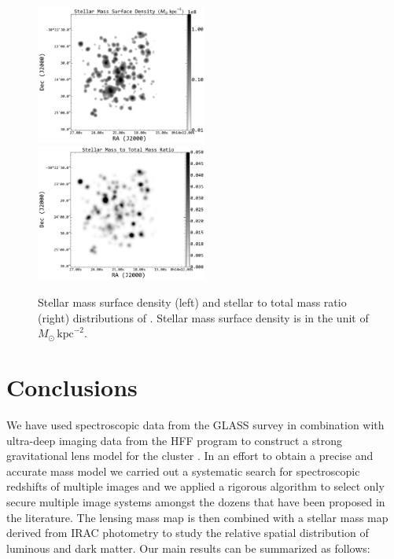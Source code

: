 \begin{figure}
    \includegraphics[width=0.5\textwidth]{fig/a2744_clmember_smass_map_kpc2.pdf}
    \includegraphics[width=0.5\textwidth]{fig/total_stellar_mass_ratio_A2744.pdf}
    \caption[Stellar mass surface density and stellar to total mass ratio.]{Stellar mass surface density (left) and stellar to total mass ratio (right) distributions of \cler.
    Stellar mass surface density is in the unit of $M_\odot\,\text{kpc}^{-2}$.  \label{fig:stellarMassMap}}
\end{figure} 
\vspace{1cm}

\section{Conclusions}
\label{sec:conc}

We have used spectroscopic data from the GLASS survey in
combination with ultra-deep imaging data from the HFF program to
construct a strong gravitational lens model for the cluster \cler. In an
effort to obtain a precise and accurate mass model we carried out a
systematic search for spectroscopic redshifts of multiple images and
we applied a rigorous algorithm to select only secure multiple image
systems amongst the dozens that have been proposed in the
literature. The lensing mass map is then combined with a stellar
mass map derived from IRAC photometry to study the relative spatial
distribution of luminous and dark matter.  Our main results can be
summarized as follows:

